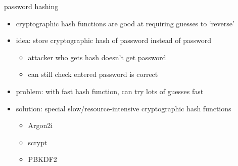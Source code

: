 \begin{frame}{password hashing}
    \begin{itemize}
        \item cryptographic hash functions are good at requiring guesses to `reverse'
        \item idea: store cryptographic hash of password instead of password
            \begin{itemize}
            \item attacker who gets hash doesn't get password
            \item can still check entered password is correct
            \end{itemize}
            \vspace{.5cm}
        \item<2-> problem: with fast hash function, can try lots of guesses fast
        \item<3-> solution: special slow/resource-intensive cryptographic hash functions
            \begin{itemize}
            \item Argon2i
            \item scrypt
            \item PBKDF2
            \end{itemize}
    \end{itemize}
\end{frame}
